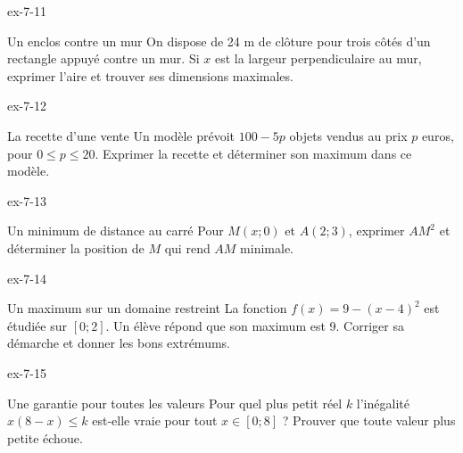 \clearpage{}
\begin{blocLivre}{ex-7-11}
\begin{exercice}[3]{Un enclos contre un mur}
On dispose de 24 m de clôture pour trois côtés d’un rectangle appuyé contre un mur. Si $x$ est la largeur perpendiculaire au mur, exprimer l’aire et trouver ses dimensions maximales.
\label{fig-ex-7-11}
\end{exercice}
\end{blocLivre}
\begin{blocLivre}{ex-7-12}
\begin{exercice}[3]{La recette d’une vente}
Un modèle prévoit $100-5p$ objets vendus au prix $p$ euros, pour $0\le p\le20$. Exprimer la recette et déterminer son maximum dans ce modèle.
\end{exercice}
\end{blocLivre}
\begin{blocLivre}{ex-7-13}
\begin{exercice}[3]{Un minimum de distance au carré}
Pour $M(x;0)$ et $A(2;3)$, exprimer $AM^2$ et déterminer la position de $M$ qui rend $AM$ minimale.
\label{fig-ex-7-13}
\end{exercice}
\end{blocLivre}
\begin{blocLivre}{ex-7-14}
\begin{exercice}[3]{Un maximum sur un domaine restreint}
La fonction $f(x)=9-(x-4)^2$ est étudiée sur $[0;2]$. Un élève répond que son maximum est 9. Corriger sa démarche et donner les bons extrémums.
\end{exercice}
\end{blocLivre}
\begin{blocLivre}{ex-7-15}
\begin{exercice}[3]{Une garantie pour toutes les valeurs}
Pour quel plus petit réel $k$ l’inégalité $x(8-x)\le k$ est-elle vraie pour tout $x\in[0;8]$ ? Prouver que toute valeur plus petite échoue.
\end{exercice}
\end{blocLivre}

\clearpage
